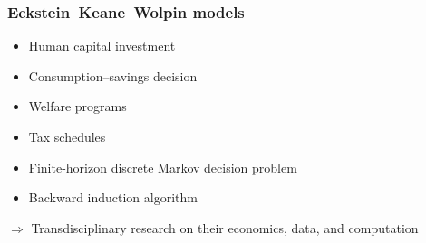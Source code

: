 \begin{frame}\frametitle{Eckstein--Keane--Wolpin models}

\begin{multicols}{2}

	\vspace{0.3cm}
	\begin{itemize}\setlength\itemsep{1em}
		\item Human capital investment
		\item Consumption--savings decision
	\end{itemize}

    \pause

	\vspace{0.3cm}
	\begin{itemize}\setlength\itemsep{1em}
		\item Welfare programs
		\item Tax schedules
	\end{itemize}

\end{multicols}

 \pause
{}\vspace{0.3cm}
\begin{itemize}\setlength\itemsep{1em}
	\item Finite-horizon discrete Markov decision problem
	\item Backward induction algorithm
\end{itemize}


\pause

\hspace{0.3cm}$\Rightarrow$ Transdisciplinary research on their \alert<4>{economics}, \alert<5>{data}, and \alert<6>{computation}

\end{frame}


